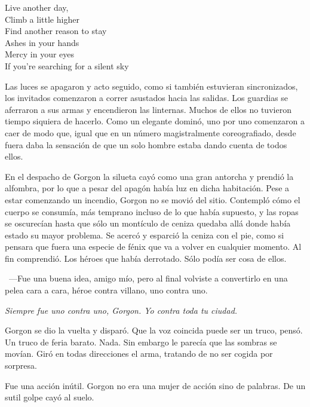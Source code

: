 \begin{center}
    \begin{em}
        Live another day,\\
        Climb a little higher\\
        Find another reason to stay\\
        Ashes in your hands\\
        Mercy in your eyes\\
        If you're searching for a silent sky\\
    \end{em}
\end{center}

Las luces se apagaron y acto seguido, como si también estuvieran sincronizados, los invitados comenzaron a correr asustados hacia las salidas. Los guardias se aferraron a sus armas y encendieron las linternas. Muchos de ellos no tuvieron tiempo siquiera de hacerlo. Como un elegante dominó, uno por uno comenzaron a caer de modo que, igual que en un número magistralmente coreografiado, desde fuera daba la sensación de que un solo hombre estaba dando cuenta de todos ellos.

\parbreak
En el despacho de Gorgon la silueta cayó como una gran antorcha y prendió la alfombra, por lo que a pesar del apagón había luz en dicha habitación. Pese a estar comenzando un incendio, Gorgon no se movió del sitio. Contempló cómo el cuerpo se consumía, más temprano incluso de lo que había supuesto, y las ropas se oscurecían hasta que sólo un montículo de ceniza quedaba allá donde había estado su mayor problema. Se acercó y esparció la ceniza con el pie, como si pensara que fuera una especie de fénix que va a volver en cualquier momento. Al fin comprendió. Los héroes que había derrotado. Sólo podía ser cosa de ellos.

~---Fue una buena idea, amigo mío, pero al final volviste a convertirlo en una pelea cara a cara, héroe contra villano, uno contra uno.

\emph{Siempre fue uno contra uno, Gorgon. Yo contra toda tu ciudad.}

Gorgon se dio la vuelta y disparó. Que la voz coincida puede ser un truco, pensó. Un truco de feria barato. Nada. Sin embargo le parecía que las sombras se movían. Giró en todas direcciones el arma, tratando de no ser cogida por sorpresa.

Fue una acción inútil. Gorgon no era una mujer de acción sino de palabras. De un sutil golpe cayó al suelo.

